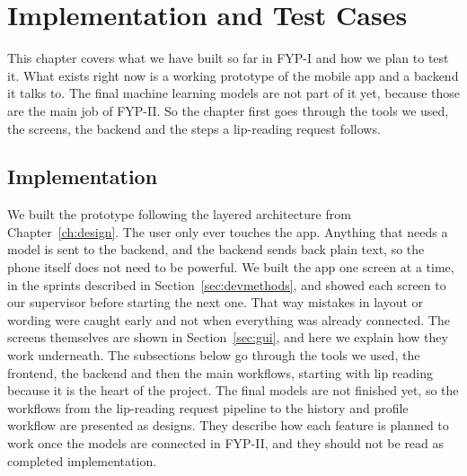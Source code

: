 \documentclass{FastFyp}
\begin{document}
\chapter{Implementation and Test Cases}
\label{ch:impl}
This chapter covers what we have built so far in FYP-I and how we plan to test it. What exists right now is a working prototype of the mobile app and a backend it talks to. The final machine learning models are not part of it yet, because those are the main job of FYP-II. So the chapter first goes through the tools we used, the screens, the backend and the steps a lip-reading request follows.

\section{Implementation}
We built the prototype following the layered architecture from Chapter~\ref{ch:design}. The user only ever touches the app. Anything that needs a model is sent to the backend, and the backend sends back plain text, so the phone itself does not need to be powerful. We built the app one screen at a time, in the sprints described in Section~\ref{sec:devmethods}, and showed each screen to our supervisor before starting the next one. That way mistakes in layout or wording were caught early and not when everything was already connected. The screens themselves are shown in Section~\ref{sec:gui}, and here we explain how they work underneath. The subsections below go through the tools we used, the frontend, the backend and then the main workflows, starting with lip reading because it is the heart of the project. The final models are not finished yet, so the workflows from the lip-reading request pipeline to the history and profile workflow are presented as designs. They describe how each feature is planned to work once the models are connected in FYP-II, and they should not be read as completed implementation.
\end{document}

